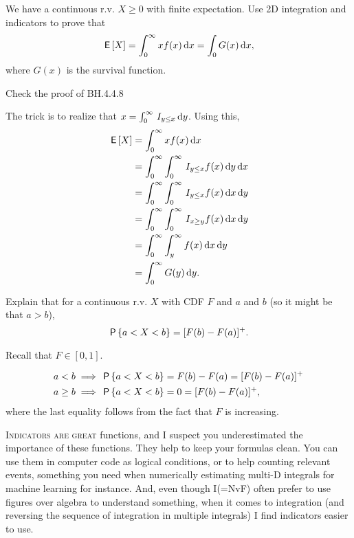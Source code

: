 \begin{exercise}
We have a continuous r.v. $X\geq 0$ with finite expectation. Use 2D integration and indicators to prove that
\begin{align}
\E X = \int_{0}^{\infty} x f(x) \d x = \int_{0} G(x) \d x,
\end{align}
where $G(x)$ is the survival function.
\begin{hint}
  Check the proof of BH.4.4.8
\end{hint}
\begin{solution}
The trick is to realize that $x = \int_0^{\infty} \1{y\leq x} \d y$. Using this,
\begin{align}
\E X
&= \int_{0}^{\infty} x f(x) \d x \\
&= \int_{0}^{\infty} \int_{0}^{\infty} \1{y \leq x} f(x) \d y \d x \\
&= \int_{0}^{\infty} \int_{0}^{\infty} \1{y \leq x} f(x) \d x \d y \\
&= \int_{0}^{\infty} \int_{0}^{\infty} \1{x \geq y} f(x) \d x \d y \\
&= \int_{0}^{\infty} \int_{y}^{\infty} f(x) \d x \d y \\
&= \int_{0}^{\infty} G(y) \d y.
\end{align}
\end{solution}
\end{exercise}


\begin{exercise}
Explain that for a continuous r.v. $X$ with CDF $F$ and $a$ and $b$ (so it might be that $a>b$),
\begin{equation}
  \label{eq:7}
\P{a< X < b} = [F(b) - F(a)]^{+}.
\end{equation}
\begin{hint}
  Recall that $F\in [0, 1]$.
\end{hint}
\begin{solution}
\begin{align}
a<b & \implies \P{a< X < b} = F(b) - F(a) = [F(b) - F(a)]^{+} \\
a\geq b & \implies \P{a< X < b} =  0 = [F(b) - F(a)]^{+},
\end{align}
where the last equality follows from the fact that $F$ is increasing.
\end{solution}
\end{exercise}

\textsc{Indicators are great} functions, and I suspect you underestimated the importance of these functions.
They help to keep your formulas clean.
You can use them in computer code as logical conditions, or to help counting relevant events, something you need when numerically estimating multi-D integrals for machine learning for instance.
And, even though I(=NvF) often prefer to use figures over algebra to understand something, when it comes to integration (and reversing the sequence of integration in multiple integrals) I find indicators easier to use.

